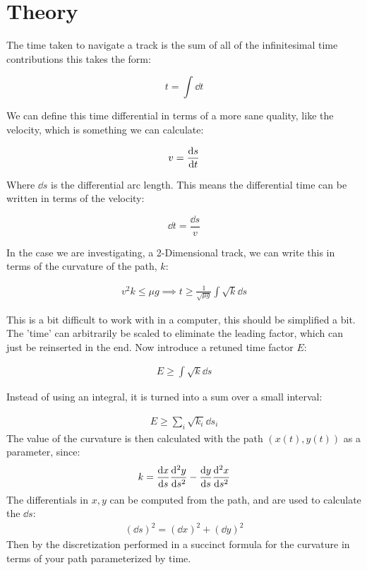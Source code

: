 \documentclass[12pt,twocolumn]{article}
\begin{document}
\section{Theory}
The time taken to navigate a track is the sum of all of the infinitesimal time contributions this takes the form:

\begin{equation}
  t=\int\dd{t}
\end{equation}

We can define this time differential in terms of a more sane quality, like the velocity, which is something we can calculate:

\begin{equation*}
  v=\dv{s}{t}
\end{equation*}

Where $\dd{s}$ is the differential arc length. This means the differential time can be written in terms of the velocity:

\begin{equation}
  \dd{t}=\frac{\dd{s}}{v}
\end{equation}

In the case we are investigating, a 2-Dimensional track, we can write this in terms of the curvature of the path, $k$:

\begin{align}
  v^2k\leq\mu g\implies t\geq\frac{1}{\sqrt{\mu g}}\int\sqrt{k}\dd{s}
\end{align}

This is a bit difficult to work with in a computer, this should be simplified a bit. The 'time' can arbitrarily be scaled to eliminate the leading factor, which can just  be reinserted in the end. Now introduce a retuned time factor $E$:

\begin{align*}
  E\geq\int\sqrt{k}\dd{s}
\end{align*}

Instead of using an integral, it is turned into a sum over a small interval:

\begin{align*}
  E\geq\sum_{i}\sqrt{k_i}\dd{s}_i
\end{align*}
The value of the curvature is then calculated with the path $(x(t),y(t))$ as a parameter, since:
\begin{align*}
  k=\dv{x}{s}\dv[2]{y}{s}-\dv{y}{s}\dv[2]{x}{s}
\end{align*}
The differentials in $x,y$ can be computed from the path, and are used to calculate the $\dd{s}$:
\begin{align*}
  (\dd{s})^2=(\dd{x})^2+(\dd{y})^2
\end{align*}
Then by the discretization performed in \cite{mit} a succinct formula for the curvature in terms of your path parameterized by time.
\end{document}
